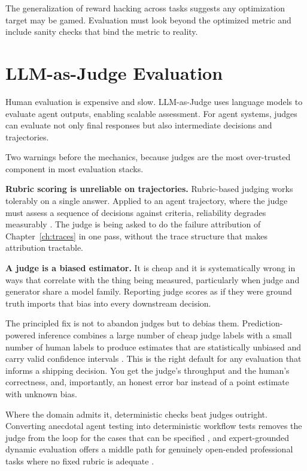 The generalization of reward hacking across tasks \cite{metr2025} suggests any optimization target may be gamed. Evaluation must look beyond the optimized metric and include sanity checks that bind the metric to reality.

\section{LLM-as-Judge Evaluation}

Human evaluation is expensive and slow. LLM-as-Judge uses language models to evaluate agent outputs, enabling scalable assessment. For agent systems, judges can evaluate not only final responses but also intermediate decisions and trajectories.

Two warnings before the mechanics, because judges are the most over-trusted
component in most evaluation stacks.

\textbf{Rubric scoring is unreliable on trajectories.} Rubric-based judging works
tolerably on a single answer. Applied to an agent trajectory, where the judge
must assess a sequence of decisions against criteria, reliability degrades
measurably \cite{judgerubric2026}. The judge is being asked to do the failure
attribution of Chapter~\ref{ch:traces} in one pass, without the trace structure
that makes attribution tractable.

\textbf{A judge is a biased estimator.} It is cheap and it is systematically
wrong in ways that correlate with the thing being measured, particularly when
judge and generator share a model family. Reporting judge scores as if they were
ground truth imports that bias into every downstream decision.

The principled fix is not to abandon judges but to debias them. Prediction-powered
inference combines a large number of cheap judge labels with a small number of
human labels to produce estimates that are statistically unbiased and carry valid
confidence intervals \cite{glide2026}. This is the right default for any
evaluation that informs a shipping decision. You get the judge's throughput and
the human's correctness, and, importantly, an honest error bar instead of a
point estimate with unknown bias.

Where the domain admits it, deterministic checks beat judges outright. Converting
anecdotal agent testing into deterministic workflow tests removes the judge from
the loop for the cases that can be specified \cite{aeval2026}, and expert-grounded
dynamic evaluation offers a middle path for genuinely open-ended professional
tasks where no fixed rubric is adequate \cite{jade2026}.

